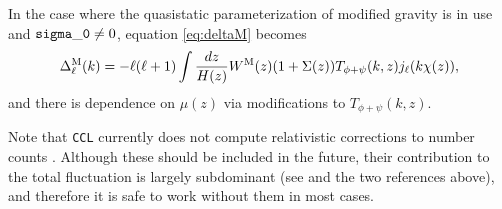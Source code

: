 \documentclass[\docopts]{\docclass}
\newcommand{\ccl}{{\tt CCL}\xspace}
\begin{document}
\begin{itemize}
        In the case where the quasistatic parameterization of modified gravity is in use and ${\tt sigma\_0} \ne 0$, equation \ref{eq:deltaM} becomes
        \begin{equation}
          \Delta_\ell^{\rm M}(k)=-\ell(\ell+1)\int \frac{dz}{H(z)} W^{\rm M}(z) (1 + \Sigma(z)) T_{\phi+\psi}(k,z) j_\ell(k\chi(z)),
          \label{eq:deltaM}
        \end{equation}
and there is dependence on $\mu(z)$ via modifications to $T_{\phi+\psi}(k,z)$.

        Note that \ccl currently does not compute relativistic corrections to number counts \cite{2011PhRvD..84d3516C,2011PhRvD..84f3505B}. Although these should be included in the future, their contribution to the total fluctuation is largely subdominant (see \cite{GReffects} and the two references above), and therefore it is safe to work without them in most cases.
\end{itemize}
\end{document}
